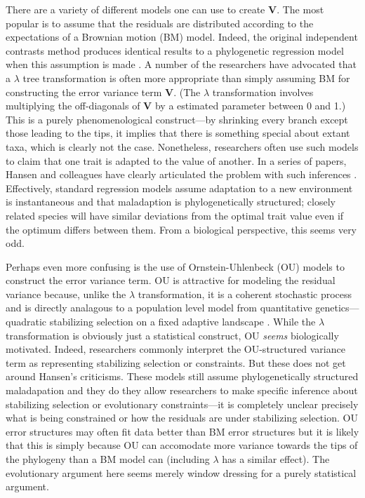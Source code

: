 There are a variety of different models one can use to create $\mathbf{V}$. The most popular is to assume that the residuals are distributed according to the expectations of a Brownian motion (BM) model. Indeed, the original independent contrasts method \citep{Felsenstein1985} produces identical results to a phylogenetic regression model when this assumption is made \citep{Blomberg2012}. A number of the researchers have advocated that a $\lambda$ tree transformation \citep{Pagel1999, Freckleton2002, Freckleton2011} is often more appropriate than simply assuming BM for constructing the error variance term $\mathbf{V}$. (The $\lambda$ transformation involves multiplying the off-diagonals of $\mathbf{V}$ by a estimated parameter between 0 and 1.) This is a purely phenomenological construct---by shrinking every branch except those leading to the tips, it implies that there is something special about extant taxa, which is clearly not the case. Nonetheless, researchers often use such models to claim that one trait is adapted to the value of another. In a series of papers, Hansen and colleagues have clearly articulated the problem with such inferences \citep{HansenOrzack2005, Hansen2008, Labra2009, Hansen2012SysBio}. Effectively, standard regression models assume adaptation to a new environment is instantaneous and that maladaption is phylogenetically structured; closely related species will have similar deviations from the optimal trait value even if the optimum differs between them. From a biological perspective, this seems very odd.

Perhaps even more confusing is the use of Ornstein-Uhlenbeck (OU) models to construct the error variance term. OU is attractive for modeling the residual variance because, unlike the $\lambda$ transformation, it is a coherent stochastic process and is directly analagous to a population level model from quantitative genetics---quadratic stabilizing selection on a fixed adaptive landscape \citep{Lande1976, HansenMartins1996}. While the $\lambda$ transformation is obviously just a statistical construct, OU \emph{seems} biologically motivated. Indeed, researchers commonly interpret the OU-structured variance term as representing stabilizing selection or constraints. But these does not get around Hansen's criticisms. These models still assume phylogenetically structured maladapation and they do they allow researchers to make specific inference about stabilizing selection or evolutionary constraints---it is completely unclear precisely what is being constrained or how the residuals are under stabilizing selection. OU error structures may often fit data better than BM error structures but it is likely that this is simply because OU can accomodate more variance towards the tips of the phylogeny than a BM model can (including $\lambda$ has a similar effect). The evolutionary argument here seems merely window dressing for a purely statistical argument. 

